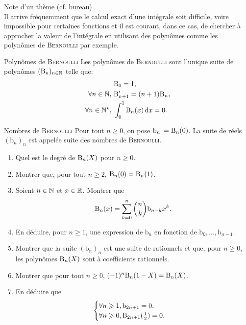 Note d'un thème (cf. bureau) \\

Il arrive fréquemment que le calcul exact d’une intégrale soit difficile, voire
impossible pour certaines fonctions et il est courant, dans ce cas, de chercher à
approcher la valeur de l’intégrale en utilisant des polynômes comme les polynômes de \textsc{Bernoulli} par exemple.

\begin{defi}{Polynômes de \textsc{Bernoulli}}
    Les polynômes de \textsc{Bernoulli} sont l'unique suite de polynômes $(\mathrm{B}_n)_{n \in \mathbb{N}}$ telle que:
    \begin{align*}
        &\mathrm{B}_0 = 1, \\
        \forall n \in \mathbb{N},\ &\mathrm{B}'_{n+1} = (n+1)\mathrm{B}_n, \\
        \forall n \in \mathbb{N}^\star,\ &\int_{0}^{1} \mathrm{B}_n(x) \, \mathrm{d} x = 0.
    \end{align*}
\end{defi}

\begin{defi}{Nombres de \textsc{Bernoulli}}
    Pour tout $n \geqslant 0$, on pose $\mathrm{b}_n \defeq \Bern_n(0)$. La suite de réels $(\mathrm{b}_n)_n$ est appelée suite des nombres de \textsc{Bernoulli}.
\end{defi}  

\begin{exercice}
    \begin{enumerate}
        \item Quel est le degré de $\mathrm{B}_n(X)$ pour $n \geqslant 0$. 
        \item Montrer que, pour tout $n \geqslant 2$, $\mathrm{B}_n(0) = \mathrm{B}_n(1)$.
        \item Soient $n \in \mathbb{N}$ et $x \in \mathbb{R}$. Montrer que 
        $$\mathrm{B}_n(x) = \sum_{k=0}^n \binom{n}{k} \mathrm{b}_{n-k} x^k.$$
        \item En déduire, pour $n \geqslant 1$, une expression de $\mathrm{b}_n$ en fonction de $\mathrm{b}_0, \dots, \mathrm{b}_{n-1}$.
        \item Montrer que la suite $(\mathrm{b}_n)_n$ est une suite de rationnels et que, pour $n \geqslant 0$, les polynômes $\mathrm{B}_n(X)$ sont à coefficients rationnels.
        \item Montrer que pour tout $n \geqslant 0$, $(-1)^n \mathrm{B}_n(1-X) = \mathrm{B}_n(X)$.
        \item En déduire que 
        $$
        \begin{cases}
            \forall n \geqslant 1, \mathrm{b}_{2n+1} = 0, \\
            \forall n \geqslant 0, \mathrm{B}_{2n+1}(\frac{1}{2}) = 0.
        \end{cases}
        $$
    \end{enumerate}    
\end{exercice}
